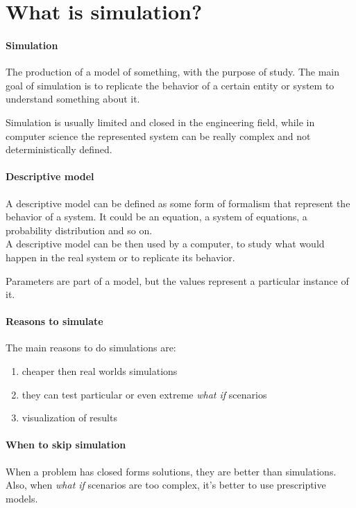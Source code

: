 \section{What is simulation?}

\paragraph{Simulation}
The production of a model of something, with the purpose 
of study. The main goal of simulation is to replicate the behavior of a certain 
entity or system to understand something about it.

Simulation is usually limited and closed in the engineering field, while 
in computer science the represented system can be really complex and
not deterministically defined.

\paragraph{Descriptive model}
A descriptive model can be defined as some form of formalism that represent 
the behavior of a system.
It could be an equation, a system of equations, a probability distribution 
and so on.\\
A descriptive model can be then used by a computer, to study what would happen 
in the real system or to replicate its behavior.

\begin{remark}
    Parameters are part of a model, but the values represent a particular 
    instance of it.
\end{remark}

\paragraph{Reasons to simulate}
The main reasons to do simulations are:
\begin{enumerate}
    \item cheaper then real worlds simulations
    \item they can test particular or even extreme \emph{what if} scenarios
    \item visualization of results
\end{enumerate}

\paragraph{When to skip simulation}
When a problem has closed forms solutions, they 
are better than simulations.
Also, when \emph{what if} scenarios are too complex, it's better to use prescriptive models.

